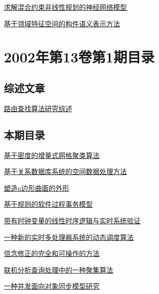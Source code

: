 \documentclass[a4paper]{article}
\begin{document}
\href{http://www.jos.org.cn/ch/reader/download_pdf.aspx?file_no=20020221&year_id=2002&quarter_id=2&falg=1}{求解混合约束非线性规划的神经网络模型}

\href{http://www.jos.org.cn/ch/reader/download_pdf.aspx?file_no=20020222&year_id=2002&quarter_id=2&falg=1}{基于领域特征空间的构件语义表示方法}


\section{\textbf{2002年第13卷第1期目录}}
\subsection{综述文章}
\href{http://www.jos.org.cn/ch/reader/download_pdf.aspx?file_no=20020106&year_id=2002&quarter_id=1&falg=1}{路由查找算法研究综述}

\subsection{本期目录}
\href{http://www.jos.org.cn/ch/reader/download_pdf.aspx?file_no=20020101&year_id=2002&quarter_id=1&falg=1}{基于密度的增量式网格聚类算法}

\href{http://www.jos.org.cn/ch/reader/download_pdf.aspx?file_no=20020102&year_id=2002&quarter_id=1&falg=1}{基于关系数据库系统的空间数据处理方法}

\href{http://www.jos.org.cn/ch/reader/download_pdf.aspx?file_no=20020103&year_id=2002&quarter_id=1&falg=1}{塑造n边形曲面的外形}

\href{http://www.jos.org.cn/ch/reader/download_pdf.aspx?file_no=20020104&year_id=2002&quarter_id=1&falg=1}{基于规则的软件过程事务模型}

\href{http://www.jos.org.cn/ch/reader/download_pdf.aspx?file_no=20020105&year_id=2002&quarter_id=1&falg=1}{带有时钟变量的线性时序逻辑与实时系统验证}

\href{http://www.jos.org.cn/ch/reader/download_pdf.aspx?file_no=20020107&year_id=2002&quarter_id=1&falg=1}{一种新的实时多处理器系统的动态调度算法}

\href{http://www.jos.org.cn/ch/reader/download_pdf.aspx?file_no=20020108&year_id=2002&quarter_id=1&falg=1}{信念修正的完全和可操作的方法}

\href{http://www.jos.org.cn/ch/reader/download_pdf.aspx?file_no=20020109&year_id=2002&quarter_id=1&falg=1}{联机分析查询处理中的一种聚集算法}

\href{http://www.jos.org.cn/ch/reader/download_pdf.aspx?file_no=20020110&year_id=2002&quarter_id=1&falg=1}{一种并发面向对象同步模型研究}
\end{document}
